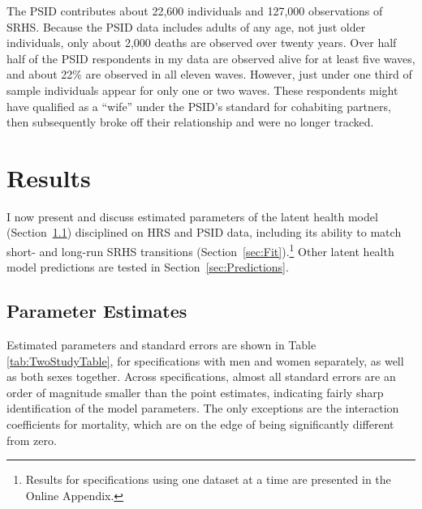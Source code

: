 \documentclass[12pt,pdftex,letterpaper]{article}
\newcommand{\RootDir}{..}
\newcommand{\TablesDir}{\RootDir/Tables}
\begin{document}
The PSID contributes about 22,600 individuals and 127,000 observations of SRHS.  Because the PSID data includes adults of any age, not just older individuals, only about 2,000 deaths are observed over twenty years. Over half half of the PSID respondents in my data are observed alive for at least five waves, and about 22\% are observed in all eleven waves.  However, just under one third of sample individuals appear for only one or two waves.  These respondents might have qualified as a ``wife'' under the PSID's standard for cohabiting partners, then subsequently broke off their relationship and were no longer tracked.


\section{Results}\label{sec:Results}

I now present and discuss estimated parameters of the latent health model (Section~\ref{sec:Parameters}) disciplined on HRS and PSID data, including its ability to match short- and long-run SRHS transitions (Section~\ref{sec:Fit}).\footnote{Results for specifications using one dataset at a time are presented in the Online Appendix.} Other latent health model predictions are tested in Section~\ref{sec:Predictions}.

\subsection{Parameter Estimates}\label{sec:Parameters}

Estimated parameters and standard errors are shown in Table \ref{tab:TwoStudyTable}, for specifications with men and women separately, as well as both sexes together. Across specifications, almost all standard errors are an order of magnitude smaller than the point estimates, indicating fairly sharp identification of the model parameters.  The only exceptions are the interaction coefficients for mortality, which are on the edge of being significantly different from zero.


\end{document}
